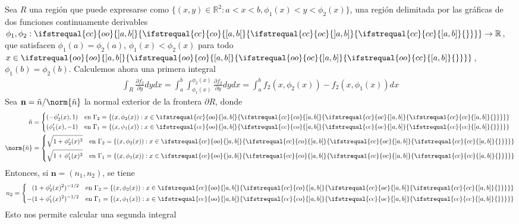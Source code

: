 \documentclass{report}
\newcommand{\realNumbers}{\mathbb{R}}
\theoremstyle{definition}
\theoremstyle{remark}
\newcommand{\leftOpenInterval}{\left]}
\newcommand{\rightOpenInterval}{\right[}
\newcommand{\leftClosedInterval}{\left[}
\newcommand{\rightClosedInterval}{\right]}
\newcommand{\interval}[3]{%
  \ifstrequal{#1}{oo}{%
    \leftOpenInterval #2, #3 \rightOpenInterval%
  }{%
    \ifstrequal{#1}{co}{%
      \leftClosedInterval #2, #3 \rightOpenInterval%
    }{%
      \ifstrequal{#1}{oc}{
        \leftOpenInterval #2, #3 \rightClosedInterval%
      }{%
        \ifstrequal{#1}{cc}{
          \leftClosedInterval #2, #3 \rightClosedInterval
        }{%
        }%
      }%
    }%
  }%
}
\begin{document}
  Sea \(R\) una región que puede expresarse como \(\{(x, y) \in \realNumbers^2 :  a < x < b, \phi_1(x) < y < \phi_2(x)\}\), una región delimitada por las gráficas de dos funciones continuamente derivables \(\phi_1, \phi_2 : \interval{cc}{a}{b} \rightarrow \realNumbers\), que satisfacen \(\phi_1(a) = \phi_2(a)\), \(\phi_1(x) < \phi_2(x)\) para todo \(x \in \interval{oo}{a}{b}\), \(\phi_1(b) = \phi_2(b)\).
  Calculemos ahora una primera integral
  \begin{align}
    \int_R \frac{\partial f_2}{\partial y} dy dx
    =
    \int_a^b\int_{\phi_1(x)}^{\phi_2(x)} \frac{\partial f_2}{\partial y} dy dx
    =
    \int_a^b f_2(x, \phi_2(x)) - f_2(x, \phi_1(x)) dx
  \end{align}
  Sea \(\mathbf{n} = \tilde{n} / \norm{\tilde{n}}\) la normal exterior de la frontera \(\partial R\),
  donde
  \begin{align}
    \tilde{n}
    &=
    \left\{
      \begin{aligned}
        (- \phi_2'(x), 1)
        && \text{en }
        \Gamma_2 = \{(x, \phi_2(x)) : x \in \interval{cc}{a}{b}\}
        \\
        (\phi_1'(x), - 1)
        && \text{en }
        \Gamma_1 = \{(x, \phi_1(x)) : x \in \interval{cc}{a}{b}\}
      \end{aligned}
    \right.
    \\
    \norm{\tilde{n}}
    &=
    \left\{
      \begin{aligned}
        \sqrt{1 + \phi_2'(x)^2}
        && \text{en }
        \Gamma_2 = \{(x, \phi_2(x)) : x \in \interval{cc}{a}{b}\}
        \\
        \sqrt{1 + \phi_1'(x)^2}
        && \text{en }
        \Gamma_1 = \{(x, \phi_1(x)) : x \in \interval{cc}{a}{b}\}
      \end{aligned}
    \right.
  \end{align}
  Entonces, si \(\mathbf{n} = (n_1, n_2)\), se tiene 
  \begin{align}
    n_2
    =
    \left\{
      \begin{aligned}
        (1 + \phi_2'(x)^2)^{- 1 / 2}
        && \text{en }
        \Gamma_2 = \{(x, \phi_2(x)) : x \in \interval{cc}{a}{b}\}
        \\
        - (1 + \phi_1'(x)^2)^{- 1 / 2}
        && \text{en }
        \Gamma_1 = \{(x, \phi_1(x)) : x \in \interval{cc}{a}{b}\}
      \end{aligned}
    \right.
  \end{align}
  Esto nos permite calcular una segunda integral
\end{document}
